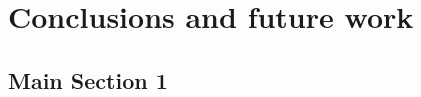 
\chapter{Conclusions and future work} %

\label{Conclusions and future work} %



\section{Main Section 1}

